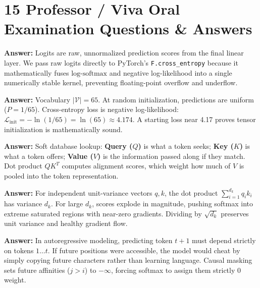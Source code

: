 \documentclass[10pt,a4paper]{article}
\begin{document}
\vspace{-0.2cm}
\section{15 Professor / Viva Oral Examination Questions \& Answers}

\begin{tcolorbox}[title=Q1: What are logits, and why do we not apply softmax during training?]
\textbf{Answer:} Logits are raw, unnormalized prediction scores from the final linear layer. We pass raw logits directly to PyTorch's \texttt{F.cross\_entropy} because it mathematically fuses $\text{log-softmax}$ and negative log-likelihood into a single numerically stable kernel, preventing floating-point overflow and underflow.
\end{tcolorbox}

\begin{tcolorbox}[title=Q2: Why is the baseline initial loss approximately 4.17?]
\textbf{Answer:} Vocabulary $|\mathcal{V}| = 65$. At random initialization, predictions are uniform ($P = 1/65$). Cross-entropy loss is negative log-likelihood: $\mathcal{L}_{\text{init}} = -\ln(1/65) = \ln(65) \approx 4.174$. A starting loss near 4.17 proves tensor initialization is mathematically sound.
\end{tcolorbox}

\begin{tcolorbox}[title=Q3: Explain Query, Key, and Value conceptually and mathematically.]
\textbf{Answer:} Soft database lookup: \textbf{Query ($Q$)} is what a token seeks; \textbf{Key ($K$)} is what a token offers; \textbf{Value ($V$)} is the information passed along if they match. Dot product $Q K^T$ computes alignment scores, which weight how much of $V$ is pooled into the token representation.
\end{tcolorbox}

\begin{tcolorbox}[title=Q4: Why divide by $\sqrt{d_k}$ in scaled dot-product attention?]
\textbf{Answer:} For independent unit-variance vectors $q, k$, the dot product $\sum_{i=1}^{d_k} q_i k_i$ has variance $d_k$. For large $d_k$, scores explode in magnitude, pushing softmax into extreme saturated regions with near-zero gradients. Dividing by $\sqrt{d_k}$ preserves unit variance and healthy gradient flow.
\end{tcolorbox}

\begin{tcolorbox}[title=Q5: What is causal masking and why is it mandatory in GPT?]
\textbf{Answer:} In autoregressive modeling, predicting token $t+1$ must depend strictly on tokens $1 \dots t$. If future positions were accessible, the model would cheat by simply copying future characters rather than learning language. Causal masking sets future affinities ($j > i$) to $-\infty$, forcing softmax to assign them strictly 0 weight.
\end{tcolorbox}
\end{document}
